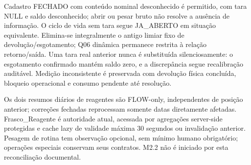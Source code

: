 \begin{regra}
Cadastro FECHADO com conteúdo nominal desconhecido é permitido, com tara NULL e saldo desconhecido; abrir ou pesar bruto não resolve a ausência de informação. O ciclo de vida sem tara segue JA\_ABERTO em situação equivalente. Elimina-se integralmente o antigo limiar fixo de devolução/esgotamento; Q06 dinâmica permanece restrita à relação retorno/saída. Uma tara real anterior nunca é substituída silenciosamente: o esgotamento confirmado mantém saldo zero, e a discrepância segue recalibração auditável. Medição inconsistente é preservada com devolução física concluída, bloqueio operacional e consumo pendente até resolução.

Os dois resumos diários de reagentes são FLOW-only, independentes de posição anterior; correções fechadas reprocessam somente datas diretamente afetadas. Frasco\_Reagente é autoridade atual, acessada por agregações server-side protegidas e cache lazy de validade máxima 30 segundos ou invalidação anterior. Pesagem de rotina tem observação opcional, sem mínimo humano obrigatório; operações especiais conservam seus contratos. M2.2 não é iniciado por esta reconciliação documental.
\end{regra}
